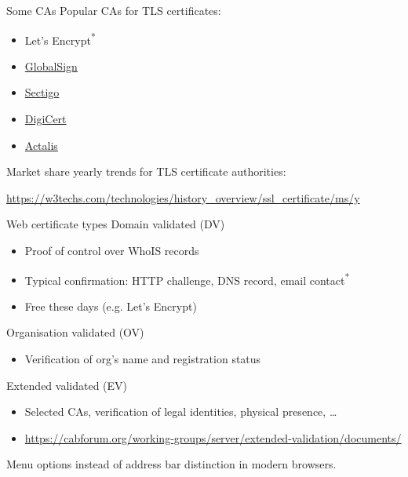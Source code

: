 \begin{frame}{Some CAs}
  Popular CAs for TLS certificates:
  \begin{itemize}[<+(1)->]
    \item Let's Encrypt\textsuperscript{*}
    \item \href{https://www.globalsign.com/en}{GlobalSign}
    \item \href{https://www.sectigo.com}{Sectigo}
    \item \href{https://www.digicert.com}{DigiCert}
    \item \href{https://www.actalis.com}{Actalis}
  \end{itemize}
  
  \vfill

  \pause
  Market share yearly trends for TLS certificate authorities:

  {\scriptsize\url{https://w3techs.com/technologies/history_overview/ssl_certificate/ms/y}}
\end{frame}

\begin{frame}{Web certificate types}
  Domain validated (DV)
  \begin{itemize}[<+(1)->]
    \item Proof of control over WhoIS records
    \item Typical confirmation: HTTP challenge, DNS record, email contact\textsuperscript{*}
    \item Free these days (e.g. Let's Encrypt)
  \end{itemize}

  \pause
  Organisation validated (OV)
  \begin{itemize}[<+(1)->]
    \item Verification of org's name and registration status
  \end{itemize}

  \pause
  Extended validated (EV)
  \begin{itemize}[<+(1)->]
    \item Selected CAs, verification of legal identities, physical presence, \dots
    \item {\scriptsize\url{https://cabforum.org/working-groups/server/extended-validation/documents/}}
  \end{itemize}

  \pause
  Menu options instead of address bar distinction in modern browsers.
\end{frame}

